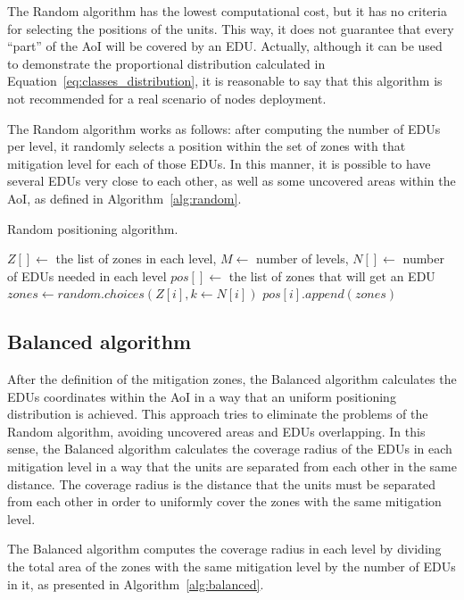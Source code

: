 \begin{refsection}
The Random algorithm has the lowest computational cost, but it has no criteria for selecting the positions of the units. This way, it does not guarantee that every ``part'' of the AoI will be covered by an EDU. Actually, although it can be used to demonstrate the proportional distribution calculated in Equation~\ref{eq:classes_distribution}, it is reasonable to say that this algorithm is not recommended for a real scenario of nodes deployment. 

The Random algorithm works as follows: after computing the number of EDUs per level, it randomly selects a position within the set of zones with that mitigation level for each of those EDUs. In this manner, it is possible to have several EDUs very close to each other, as well as some uncovered areas within the AoI, as defined in Algorithm~\ref{alg:random}.

\begin{algorithm}[ht]
  \caption{Random positioning algorithm.}\label{alg:random}
  \begin{algorithmic}
    \REQUIRE $Z[] \gets$ the list of zones in each level, $M \gets$ number of levels, $N[] \gets$ number of EDUs needed in each level
    \ENSURE $pos[] \gets$ the list of zones that will get an EDU
      \STATE $zones \gets random.choices(Z[i], k \gets N[i])$
      \STATE $pos[i].append(zones)$
    \ENDFOR
  \end{algorithmic}
\end{algorithm}


\subsection {Balanced algorithm}

After the definition of the mitigation zones, the Balanced algorithm calculates the EDUs coordinates within the AoI in a way that an uniform positioning distribution is achieved. This approach tries to eliminate the problems of the Random algorithm, avoiding uncovered areas and EDUs overlapping. In this sense, the Balanced algorithm calculates the coverage radius of the EDUs in each mitigation level in a way that the units are separated from each other in the same distance. The coverage radius is the distance that the units must be separated from each other in order to uniformly cover the zones with the same mitigation level. 

The Balanced algorithm computes the coverage radius in each level by dividing the total area of the zones with the same mitigation level by the number of EDUs in it, as presented in Algorithm~\ref{alg:balanced}. 


\end{refsection}

